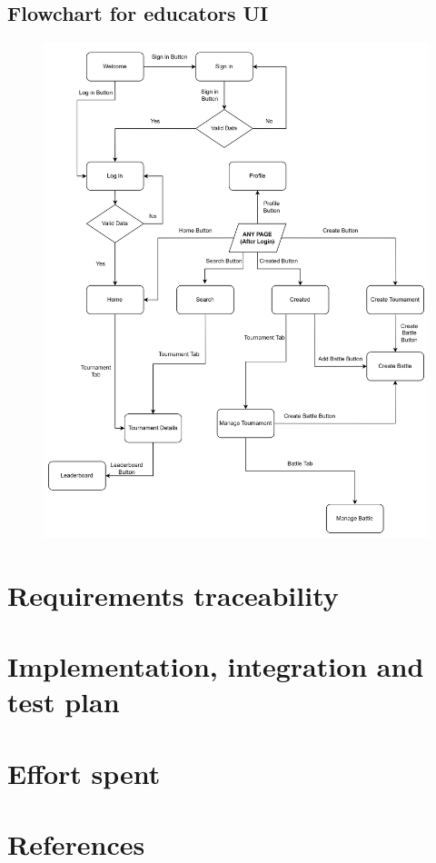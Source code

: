 \documentclass[12pt, a4paper]{report}
\begin{document}
    \section{Flowchart for educators UI}
    \begin{figure}[H]
        \centering\includegraphics[width=0.9\linewidth]{images/educators_UI.png}
    \end{figure}

    \newpage 

\chapter{Requirements traceability}

\newpage 

\chapter{Implementation, integration and test plan}

\newpage 

\chapter{Effort spent}

\newpage 

\chapter{References}
\end{document}
